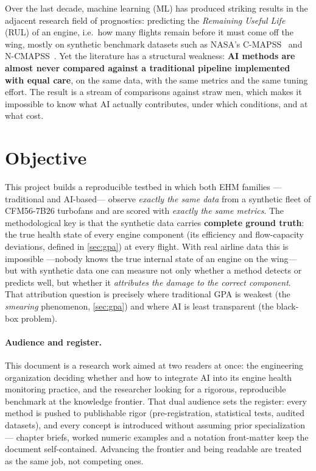 Over the last decade, machine learning (ML) has produced striking results in the adjacent research
field of prognostics: predicting the \emph{Remaining Useful Life} (RUL) of an engine, i.e.\ how
many flights remain before it must come off the wing, mostly on synthetic benchmark datasets
such as NASA's C-MAPSS~\cite{Saxena2008} and N-CMAPSS~\cite{AriasChao2021}. Yet the literature
has a structural weakness: \textbf{AI methods are almost never compared against a traditional
pipeline implemented with equal care}, on the same data, with the same metrics and the same
tuning effort. The result is a stream of comparisons against straw men, which makes it
impossible to know what AI actually contributes, under which conditions, and at what cost.

\section{Objective}

This project builds a reproducible testbed in which both EHM families ---traditional and
AI-based--- observe \emph{exactly the same data} from a synthetic fleet of CFM56-7B26 turbofans
and are scored with \emph{exactly the same metrics}. The methodological key is that the
synthetic data carries \textbf{complete ground truth}: the true health state of every engine
component (its efficiency and flow-capacity deviations, defined in \cref{sec:gpa}) at every
flight. With real airline data this is impossible ---nobody knows the true internal state of an
engine on the wing--- but with synthetic data one can measure not only whether a method detects
or predicts well, but whether it \emph{attributes the damage to the correct component}. That
attribution question is precisely where traditional GPA is weakest (the \emph{smearing}
phenomenon, \cref{sec:gpa}) and where AI is least transparent (the black-box problem).

\paragraph{Audience and register.} This document is a research work aimed at two readers at
once: the engineering organization deciding whether and how to integrate AI into its engine
health monitoring practice, and the researcher looking for a rigorous, reproducible
benchmark at the knowledge frontier. That dual audience sets the register: every method is
pushed to publishable rigor (pre-registration, statistical tests, audited datasets), and
every concept is introduced without assuming prior specialization --- chapter briefs, worked
numeric examples and a notation front-matter keep the document self-contained. Advancing the
frontier and being readable are treated as the same job, not competing ones.

